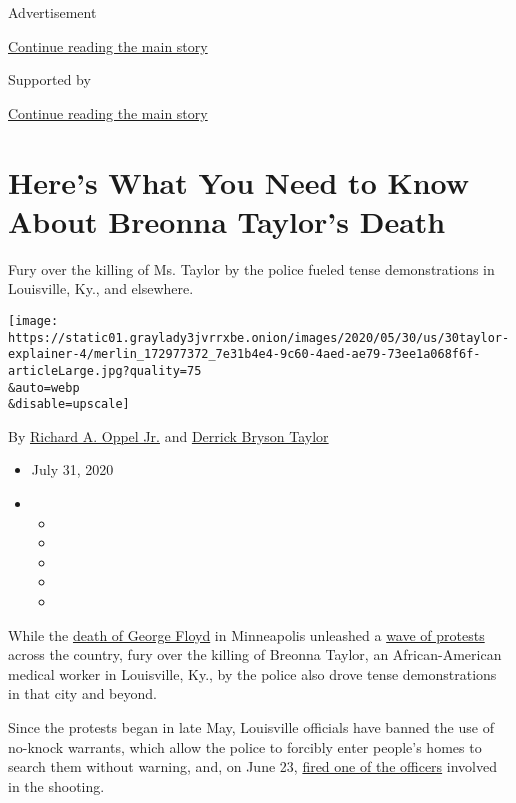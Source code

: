 Advertisement

\protect\hyperlink{after-top}{Continue reading the main story}

Supported by

\protect\hyperlink{after-sponsor}{Continue reading the main story}

\hypertarget{heres-what-you-need-to-know-about-breonna-taylors-death}{%
\section{Here's What You Need to Know About Breonna Taylor's
Death}\label{heres-what-you-need-to-know-about-breonna-taylors-death}}

Fury over the killing of Ms. Taylor by the police fueled tense
demonstrations in Louisville, Ky., and elsewhere.

\texttt{[image: https://static01.graylady3jvrrxbe.onion/images/2020/05/30/us/30taylor-explainer-4/merlin\_172977372\_7e31b4e4-9c60-4aed-ae79-73ee1a068f6f-articleLarge.jpg?quality=75\\\&auto=webp\\\&disable=upscale]}

By
\href{https://www.nytimes3xbfgragh.onion/by/richard-a-oppel-jr}{Richard
A. Oppel Jr.} and
\href{https://www.nytimes3xbfgragh.onion/by/derrick-bryson-taylor}{Derrick
Bryson Taylor}

\begin{itemize}
\item
  July 31, 2020
\item
  \begin{itemize}
  \item
  \item
  \item
  \item
  \item
  \end{itemize}
\end{itemize}

While the
\href{https://www.nytimes3xbfgragh.onion/2020/05/29/us/minneapolis-police-george-floyd.html}{death
of George Floyd} in Minneapolis unleashed a
\href{https://www.nytimes3xbfgragh.onion/news-event/george-floyd-protests-minneapolis-new-york-los-angeles}{wave
of protests} across the country, fury over the killing of Breonna
Taylor, an African-American medical worker in Louisville, Ky., by the
police also drove tense demonstrations in that city and beyond.

Since the protests began in late May, Louisville officials have banned
the use of no-knock warrants, which allow the police to forcibly enter
people's homes to search them without warning, and, on June 23,
\href{https://www.nytimes3xbfgragh.onion/2020/06/23/us/breonna-taylor-brett-hankison-fired.html}{fired
one of the officers} involved in the shooting.

